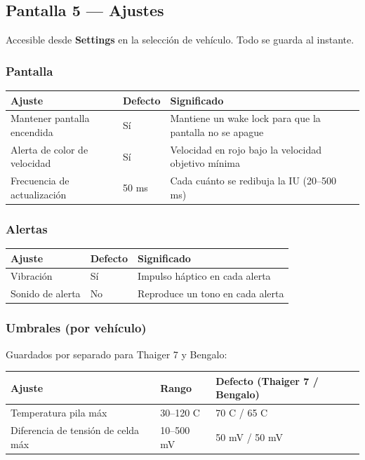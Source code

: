 \documentclass[11pt,a4paper,oneside]{report}
\newcommand{\degC}{\textdegree C}
\begin{document}
\subsection{Pantalla 5 --- Ajustes}
Accesible desde \textbf{Settings} en la selección de vehículo. Todo se guarda al
instante.

\subsubsection{Pantalla}

\begin{tabularx}{\linewidth}{@{}llL@{}}
\toprule
\textbf{Ajuste} & \textbf{Defecto} & \textbf{Significado}\\
\midrule
Mantener pantalla encendida & Sí & Mantiene un wake lock para que la pantalla no se apague\\
Alerta de color de velocidad & Sí & Velocidad en rojo bajo la velocidad objetivo mínima\\
Frecuencia de actualización & 50 ms & Cada cuánto se redibuja la IU (20--500 ms)\\
\bottomrule
\end{tabularx}

\subsubsection{Alertas}

\begin{tabularx}{\linewidth}{@{}llL@{}}
\toprule
\textbf{Ajuste} & \textbf{Defecto} & \textbf{Significado}\\
\midrule
Vibración & Sí & Impulso háptico en cada alerta\\
Sonido de alerta & No & Reproduce un tono en cada alerta\\
\bottomrule
\end{tabularx}

\subsubsection{Umbrales (por vehículo)}
Guardados por separado para Thaiger 7 y Bengalo:

\begin{tabularx}{\linewidth}{@{}llL@{}}
\toprule
\textbf{Ajuste} & \textbf{Rango} & \textbf{Defecto (Thaiger 7 / Bengalo)}\\
\midrule
Temperatura pila máx & 30--120 \degC{} & 70 \degC{} / 65 \degC{}\\
Diferencia de tensión de celda máx & 10--500 mV & 50 mV / 50 mV\\
\bottomrule
\end{tabularx}
\end{document}
